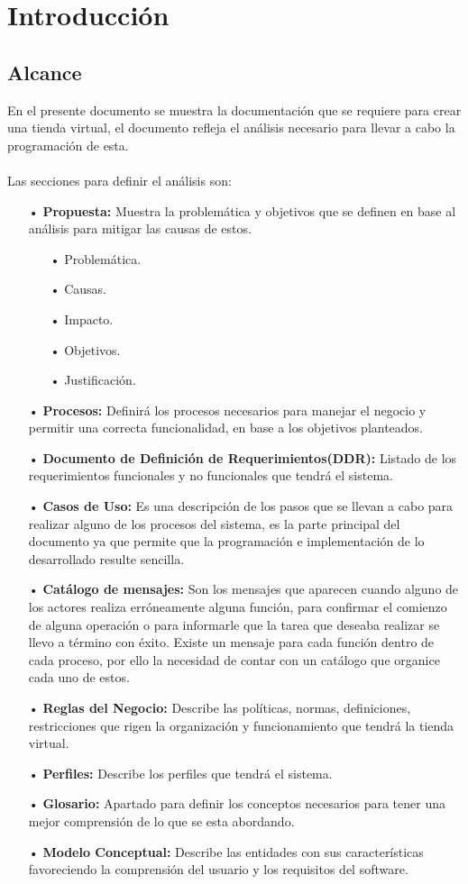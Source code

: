 \chapter{Introducci\'on}

\section{Alcance}
En el presente documento se muestra la documentación que se requiere para crear una tienda virtual, el documento refleja el análisis necesario para llevar a cabo la programación de esta.\\ \\ Las secciones para definir el análisis son:

\begin{itemize}
    \item[•] \textbf{Propuesta:} Muestra la problemática y objetivos que se definen en base al análisis para mitigar las causas de estos.
             \begin{itemize}
             	\item[•] Problemática.
             	\item[•] Causas.
             	\item[•] Impacto.
             	\item[•] Objetivos.
             	\item[•] Justificación.
             \end{itemize}
	\item[•] \textbf{Procesos:} Definirá los procesos necesarios para manejar el negocio y permitir una correcta funcionalidad, en base a los objetivos planteados.
	\item[•] \textbf{Documento de Definición de Requerimientos(DDR):} Listado de los requerimientos funcionales y no funcionales que tendrá el sistema.
	\item[•] \textbf{Casos de Uso:} Es una descripción de los pasos que se llevan a cabo para realizar alguno de los procesos  del sistema, es la parte principal del documento ya que permite que la programación e implementación de lo desarrollado resulte sencilla.
	\item[•] \textbf{Catálogo de mensajes:} Son los mensajes que aparecen cuando alguno de los actores realiza erróneamente alguna función, para confirmar el comienzo de alguna operación o para informarle que la tarea que deseaba realizar se llevo a término con éxito. Existe un mensaje para cada función dentro de cada proceso, por ello la necesidad de contar con un catálogo que organice cada uno de estos.
	\item[•] \textbf{Reglas del Negocio:} Describe las políticas, normas, definiciones, restricciones que rigen la organización y funcionamiento que tendr\'a la tienda virtual.
	\item[•] \textbf{Perfiles:} Describe los perfiles que tendrá el sistema.
	\item[•] \textbf{Glosario:} Apartado para definir los conceptos necesarios para tener una mejor comprensión de lo que se esta abordando.
	\item[•] \textbf{Modelo Conceptual:} Describe las entidades con sus características favoreciendo la comprensi\'on del usuario y los requisitos del software.
\end{itemize}